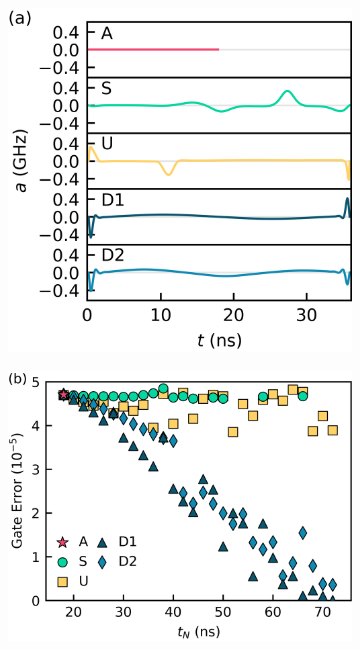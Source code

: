 \documentclass[
  amsfonts,
  amsmath,
  amssymb,
  pra,
  twocolumn,
  superscriptaddress,
]{revtex4-2}
\begin{document}
\begin{figure}[ht]
  \begin{subfigure}{.315\textwidth}
    \includegraphics[width=\linewidth]{f2a.png}
    \caption{\label{fig:statica}}
  \end{subfigure}\hfill
  \begin{subfigure}{.4\textwidth}
    \includegraphics[width=\linewidth]{f2b.png}
    \caption{\label{fig:staticb}}

\end{subfigure}
\end{figure}
\end{document}
